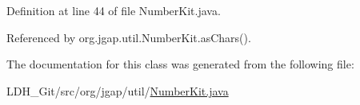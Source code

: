 Definition at line 44 of file Number\-Kit.\-java.



Referenced by org.\-jgap.\-util.\-Number\-Kit.\-as\-Chars().



The documentation for this class was generated from the following file\-:\begin{DoxyCompactItemize}
\item 
L\-D\-H\-\_\-\-Git/src/org/jgap/util/\hyperlink{_number_kit_8java}{Number\-Kit.\-java}\end{DoxyCompactItemize}
